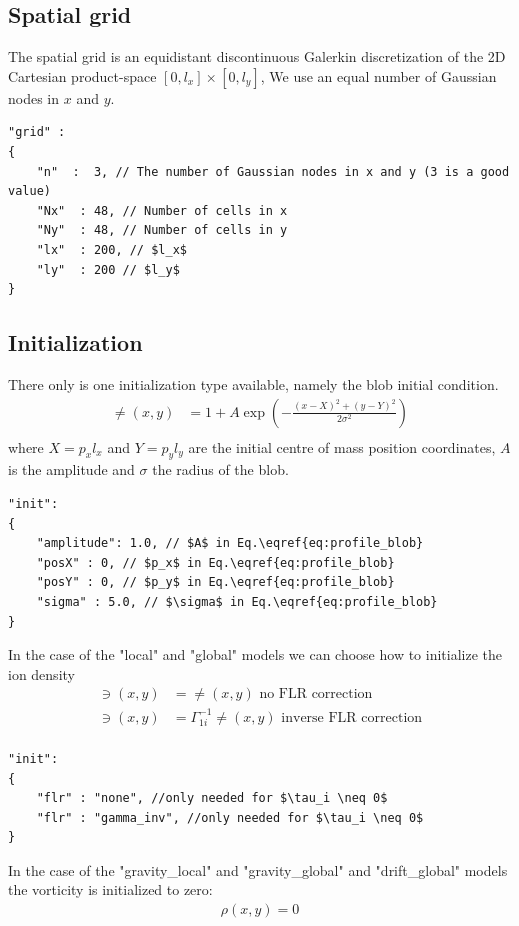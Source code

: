 \subsection{Spatial grid} \label{sec:spatial}
The spatial grid is an equidistant discontinuous Galerkin discretization of the
2D Cartesian product-space
$[ 0, l_x]\times [0, l_y]$,
We use an equal number of Gaussian nodes in $x$ and $y$.
\begin{verbatim}
"grid" :
{
    "n"  :  3, // The number of Gaussian nodes in x and y (3 is a good value)
    "Nx"  : 48, // Number of cells in x
    "Ny"  : 48, // Number of cells in y
    "lx"  : 200, // $l_x$
    "ly"  : 200 // $l_y$
}
\end{verbatim}


\subsection{Initialization}
There only is one initialization type available, namely the blob initial condition.
\begin{align} \label{eq:profile_blob}
    \ne(x,y) &= 1 + A\exp\left( -\frac{(x-X)^2 + (y-Y)^2}{2\sigma^2}\right) \\
\end{align}
where $X = p_xl_x$ and $Y= p_yl_y$ are the initial centre of mass position coordinates, $A$ is the amplitude and $\sigma$ the
radius of the blob.
\begin{verbatim}
"init":
{
    "amplitude": 1.0, // $A$ in Eq.\eqref{eq:profile_blob}
    "posX" : 0, // $p_x$ in Eq.\eqref{eq:profile_blob}
    "posY" : 0, // $p_y$ in Eq.\eqref{eq:profile_blob}
    "sigma" : 5.0, // $\sigma$ in Eq.\eqref{eq:profile_blob}
}
\end{verbatim}
In the case of the "local" and "global" models we can choose how to initialize
the ion density
\begin{align}
    \ni(x,y) &= \ne(x,y) \text{ no FLR correction} \\
    \ni(x,y) &= \Gamma_{1i}^{-1} \ne(x,y) \text{ inverse FLR correction} \\
\end{align}
\begin{verbatim}
"init":
{
    "flr" : "none", //only needed for $\tau_i \neq 0$
    "flr" : "gamma_inv", //only needed for $\tau_i \neq 0$
}
\end{verbatim}
In the case of the "gravity\_local" and "gravity\_global" and "drift\_global" models
the vorticity is initialized to zero:
\begin{align}
    \rho(x,y) = 0
\end{align}


